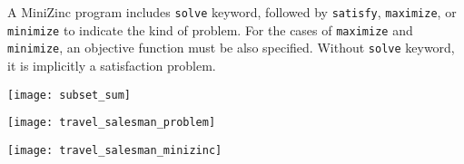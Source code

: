 \documentclass{article}
\begin{document}
A MiniZinc program includes \texttt{solve} keyword, followed by
\texttt{satisfy}, \texttt{maximize}, or \texttt{minimize} to indicate the kind
of problem. For the cases of \texttt{maximize} and \texttt{minimize}, an
objective function must be also specified. Without \texttt{solve} keyword, it
is implicitly a satisfaction problem.
\begin{example}
    \begin{center}
        \texttt{[image: subset\_sum]}
    \end{center}
\end{example}
\begin{example}
   \begin{center}
       \texttt{[image: travel\_salesman\_problem]}
   \end{center} 
   \begin{center}
       \texttt{[image: travel\_salesman\_minizinc]}
   \end{center}
\end{example}
\end{document}
